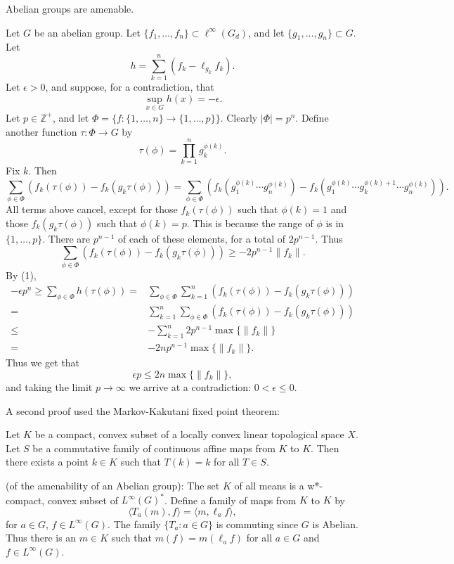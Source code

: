 \documentclass[12pt]{report}
\begin{document}
\begin{theorem}\label{abelian}
Abelian groups are amenable.
\end{theorem}
\proof
Let $G$ be an abelian group.
Let $\{f_1,\dots ,f_n\} \subset \ell^\infty(G_d)$, and let $\{g_1,\dots ,g_n\} \subset G$.
Let
\[
h = \sum_{k=1}^n \left( f_k - \ell_{g_k}f_k\right).
\]
Let $\epsilon > 0$, and suppose, for a contradiction, that
\[
\sup_{x\in G} h(x) = -\epsilon.\tag{1}
\]
Let $p\in\mathbb{Z}^+$, and let $\Phi = \{f:\{1,\dots ,n\}\rightarrow \{1,\dots ,p\}\}$.
Clearly $| \Phi | = p^n$.  Define another function $\tau:\Phi\rightarrow G$ by
\[
\tau(\phi) = \prod_{k=1}^n g_k^{\phi(k)}.
\]
Fix $k$.  Then
\[
\sum_{\phi\in\Phi} \left(f_k(\tau(\phi)) - f_k(g_k\tau(\phi))\right) = 
\sum_{\phi\in\Phi} \left(f_k(g_1^{\phi(k)}\cdots g_n^{\phi(k)}) - f_k(g_1^{\phi(k)}\cdots g_k^{\phi(k)+1}\cdots g_n^{\phi(k)})\right).
\]
All terms above cancel, except for those $f_k(\tau(\phi))$ such that $\phi(k) = 1$ and those $f_k(g_k\tau(\phi))$
such that $\phi(k) = p$.  This is because the range of $\phi$ is in $\{1,\dots ,p\}$.  There are $p^{n-1}$ of each
of these elements, for a total of $2p^{n-1}$.  Thus
\[
\sum_{\phi\in\Phi} \left(f_k(\tau(\phi)) - f_k(g_k\tau(\phi))\right) \geq -2p^{n-1}\|f_k\|.
\]
By (1),
\begin{align*}
-\epsilon p^n \geq \sum_{\phi\in\Phi}h(\tau(\phi))=& \sum_{\phi\in\Phi}\sum_{k=1}^n (f_k(\tau(\phi)) - f_k(g_k\tau(\phi))) \\
=& \sum_{k=1}^n\sum_{\phi\in\Phi}(f_k(\tau(\phi)) - f_k(g_k\tau(\phi))) \\
\leq& -\sum_{k=1}^n 2p^{n-1}\max\{\|f_k\|\} \\
=& -2np^{n-1}\max\{\|f_k\|\}.
\end{align*}
Thus we get that
\[
\epsilon p \leq 2n\max\{\|f_k\|\},
\]
and taking the limit $p\rightarrow\infty$ we arrive at a contradiction: $0<\epsilon\leq 0$.
\done

A second proof used the Markov-Kakutani fixed point theorem:
\begin{theorem}
Let $K$ be a compact, convex subset of a locally convex linear topological space $X$.
Let $S$ be a commutative family of continuous affine maps from $K$ to $K$.  Then
there exists a point $k\in K$ such that $T(k) = k$ for all $T\in S$.
\end{theorem}

\proof (of the amenability of an Abelian group):
The set $K$ of all means is a w*-compact, convex subset of $L^\infty(G)^*$.
Define a family of maps from $K$ to $K$ by
\[
\langle T_a(m),f\rangle = \langle m, \ell_a f\rangle,
\]
for $a\in G$, $f\in L^\infty(G)$.  The family $\{T_a:a\in G\}$ is commuting
since $G$ is Abelian.  Thus there is an $m\in K$ such that $m(f) = m(\ell_a f)$
for all $a\in G$ and $f\in L^\infty(G)$.
\done
\end{document}
